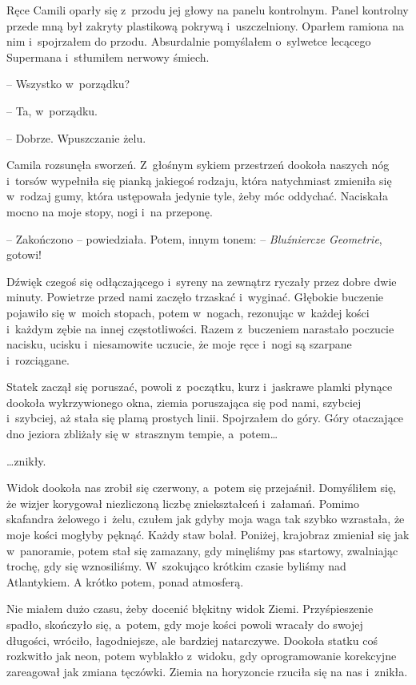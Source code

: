 \documentclass[oneside,polish,12pt,sfheadings]{mwbk}
\begin{document}
Ręce Camili oparły się z~przodu jej głowy na panelu kontrolnym. Panel
kontrolny przede mną był zakryty plastikową pokrywą i~uszczelniony.
Oparłem ramiona na nim i~spojrzałem do przodu. Absurdalnie pomyślałem o~sylwetce lecącego Supermana i~stłumiłem nerwowy śmiech.

-- Wszystko w~porządku?

-- Ta, w~porządku.

-- Dobrze. Wpuszczanie żelu.

Camila rozsunęła sworzeń. Z~głośnym sykiem przestrzeń dookoła naszych
nóg i~torsów wypełniła się pianką jakiegoś rodzaju, która natychmiast
zmieniła się w~rodzaj gumy, która ustępowała jedynie tyle, żeby móc
oddychać. Naciskała mocno na moje stopy, nogi i~na przeponę.

-- Zakończono -- powiedziała. Potem, innym tonem: -- \emph{Bluźniercze
Geometrie}, gotowi!

Dźwięk czegoś się odłączającego i~syreny na zewnątrz ryczały przez dobre
dwie minuty. Powietrze przed nami zaczęło trzaskać i~wyginać. Głębokie
buczenie pojawiło się w~moich stopach, potem w~nogach, rezonując w~każdej kości i~każdym zębie na innej częstotliwości. Razem z~buczeniem
narastało poczucie nacisku, ucisku i~niesamowite uczucie, że moje ręce i~nogi są szarpane i~rozciągane.

Statek zaczął się poruszać, powoli z~początku, kurz i~jaskrawe plamki
płynące dookoła wykrzywionego okna, ziemia poruszająca się pod nami,
szybciej i~szybciej, aż stała się plamą prostych linii. Spojrzałem do
góry. Góry otaczające dno jeziora zbliżały się w~strasznym tempie, a~potem\ldots

\ldots znikły.

Widok dookoła nas zrobił się czerwony, a~potem się przejaśnił.
Domyśliłem się, że wizjer korygował niezliczoną liczbę zniekształceń i~załamań. Pomimo skafandra żelowego i~żelu, czułem jak gdyby moja waga
tak szybko wzrastała, że moje kości mogłyby pęknąć. Każdy staw bolał.
Poniżej, krajobraz zmieniał się jak w~panoramie, potem stał się
zamazany, gdy minęliśmy pas startowy, zwalniając trochę, gdy się
wznosiliśmy. W~szokująco krótkim czasie byliśmy nad Atlantykiem. A
krótko potem, ponad atmosferą.

Nie miałem dużo czasu, żeby docenić błękitny widok Ziemi. Przyśpieszenie
spadło, skończyło się, a~potem, gdy moje kości powoli wracały do swojej
długości, wróciło, łagodniejsze, ale bardziej natarczywe. Dookoła statku
coś rozkwitło jak neon, potem wyblakło z~widoku, gdy oprogramowanie
korekcyjne zareagował jak zmiana tęczówki. Ziemia na horyzoncie rzuciła
się na nas i~znikła.
\end{document}
